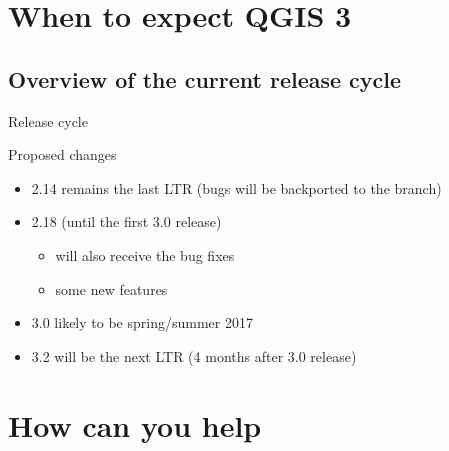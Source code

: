 \section{When to expect QGIS 3}
\subsection{Overview of the current release cycle}
\begin{frame}{Release cycle}
\end{frame}

\begin{frame}{Proposed changes}
	\begin{block}{}
		\begin{itemize}
			\item 2.14 remains the last LTR (bugs will be backported to the branch)
			\item 2.18 (until the first 3.0 release)
				\begin{itemize}
					\item will also receive the bug fixes
					\item some new features 
				\end{itemize}
			\item 3.0 likely to be spring/summer 2017
			\item 3.2 will be the next LTR (4 months after 3.0 release)
		\end{itemize}
	\end{block}
\end{frame}

\section{How can you help}

